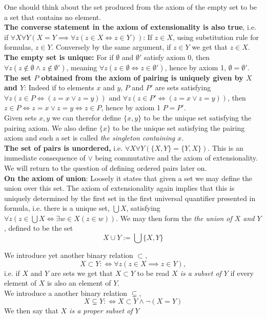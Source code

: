 \begin{remark}
    One should think about the set produced from the axiom of the empty set to be a set that contains no element.\\ \textbf{The converse statement in the axiom of extensionality is also true}, i.e. if $\forall X \forall Y(X=Y\implies \forall z(z\in X\iff z\in Y))$: If $z\in X$, using substitution rule for formulas, $z\in Y$. Conversely by the same argument, if $z\in Y$ we get that $z\in X$.\\
    \textbf{The empty set is unique:} For if $\emptyset$ and $\emptyset'$ satisfy axiom 0, then $\forall z(z\notin \emptyset \wedge z\notin \emptyset')$, meaning $\forall z(z\in \emptyset \iff z\in \emptyset')$, hence by axiom 1, $\emptyset = \emptyset'$.\\
    \textbf{The set $P$ obtained from the axiom of pairing is uniquely given by $X$ and $Y$}: Indeed if to elements $x$ and $y$, $P$ and $P'$ are sets satisfying $\forall z(z\in P \iff (z=x\vee z=y))$ and $\forall z(z\in P' \iff (z=x\vee z=y))$, then $z\in P\iff z=x \vee z=y \iff z\in P$, hence by axiom 1 $P=P'$.\\
    Given sets $x,y$ we can therefor define $\{x,y\}$ to be the unique set satisfying the pairing axiom. We also define $\{x\}$ to be the unique set satisfying the pairing axiom and such a set is called \textit{the singleton containing $x$}.\\
    \textbf{The set of pairs is unordered,} i.e. $\forall X\forall Y(\{X,Y\}=\{Y,X\})$. This is an immediate consequence of $\vee$ being commutative and the axiom of extensionality. We will return to the question of defining ordered pairs later on.\\
    \textbf{On the axiom of union}: Loosely it states that given a set we may define the union over this set. The axiom of extensionality again implies that this is uniquely determined by the first set in the first universal quantifier presented in formula, i.e. there is a unique set, $\bigcup X$, satisfying $\forall z(z\in \bigcup X \iff \exists w\in X(z\in w))$. We may then form the \textit{the union of $X$ and $Y$}, defined to be the set 
    $$ X\cup Y := \bigcup \{X,Y\}$$
\end{remark}
\begin{definition}
    We introduce yet another binary relation $\subset$,
    $$X \subset Y :\iff \forall z(z\in X \implies z\in Y),$$
    i.e. if $X$ and $Y$ are sets we get that $X\subset Y$ to be read \textit{$X$ is a subset of $Y$} if every element of $X$ is also an element of $Y$.\\
    We introduce a another binary relation $\subsetneq$,
    $$ X\subsetneq Y :\iff X\subset Y \wedge \neg(X=Y)$$
    We then say that \textit{$X$ is a proper subset of $Y$}
\end{definition}
